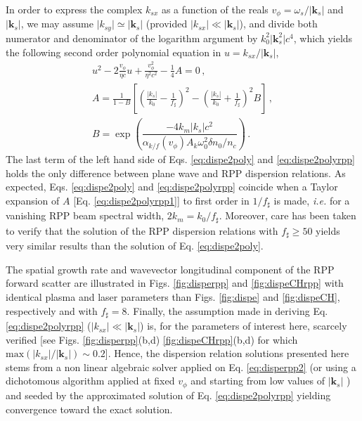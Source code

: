 \documentclass[
 reprint,
 amsmath,amssymb,
 aps,
]{revtex4-1}
\begin{document}
In order to express the complex $k_{sx}$ as a function of the reals $v_\phi=\omega_s/\vert \mathbf{k}_s\vert $ and $\vert \mathbf{k}_s\vert $, we may assume  $\vert k_{sy} \vert  \simeq \vert \mathbf{k}_s\vert$ (provided  $\vert k_{sx}\vert \ll \vert \mathbf{k}_s\vert$), and divide both numerator and denominator of the logarithm argument by $k_0^2\vert \mathbf{k}_s^2\vert c^4$, which yields the following second order polynomial equation in $u =  k_{sx}/\vert \mathbf{k}_s\vert$,
\begin{align}
u^2 -2\frac{v_\phi}{\eta c}u +\frac{v_\phi^2}{\eta^2 c^2}-\frac{1}{4}A =0 
\, , \label{eq:dispe2polyrpp} \\
A= \frac{1}{1-B}\left[ \left(\frac{\vert k_{s}\vert}{k_0}-\frac{1}{f_\sharp}\right)^2-\left(\frac{\vert k_{s}\vert}{k_0}+\frac{1}{f_\sharp}\right)^2B  \right]\, , \label{eq:dispe2polyrpp1}  \\ 
B =\exp\left(\dfrac{-4k_m \vert k_{s}\vert c^2}{\alpha_{k/f}(v_\phi)A_k \omega_0^2\delta n_0/n_c  }\right)\, .
\label{eq:dispe2polyrpp2} 
\end{align}
The last term of the left hand side of  Eqs. \eqref{eq:dispe2poly} and \eqref{eq:dispe2polyrpp} holds the only difference between plane wave and RPP dispersion relations. 
As expected,  Eqs.   \eqref{eq:dispe2poly} and     \eqref{eq:dispe2polyrpp} coincide when  a Taylor expansion of $A$ [Eq. \eqref{eq:dispe2polyrpp1}] to first order  in $1/f_\sharp$ is made, \emph{i.e.} for a vanishing  RPP beam spectral width, $2k_m=k_0/f_\sharp$.
Moreover, care has been taken to verify that the solution of the RPP dispersion relations with  $f_\sharp \ge 50$ yields  very similar results than the solution of Eq. \eqref{eq:dispe2poly}.

The spatial growth rate and wavevector  longitudinal component of the RPP forward scatter are illustrated in  
Figs. \ref{fig:disperpp} and \ref{fig:dispeCHrpp} with identical plasma and laser parameters than Figs.  \ref{fig:dispe} and \ref{fig:dispeCH}, respectively and  with $f_\sharp=8$. 
%
Finally, the assumption made in deriving Eq. \eqref{eq:dispe2polyrpp} ($\vert k_{sx}\vert \ll \vert \mathbf{k}_s\vert$) is, for the parameters of interest here, scarcely  verified [see Figs. \ref{fig:disperpp}(b,d)  \ref{fig:dispeCHrpp}(b,d) for which  $\mathrm{max}(\vert k_{sx}\vert/ \vert \mathbf{k}_s\vert)\sim 0.2$]. Hence, the dispersion relation solutions presented here stems from a non linear algebraic solver applied on Eq. \eqref{eq:disperpp2} (or using a dichotomous algorithm applied at fixed  $v_\phi$ and starting from low values of $\vert \mathbf{k}_s\vert$ ) and  seeded by the approximated solution of Eq. \eqref{eq:dispe2polyrpp} yielding convergence toward the exact solution. 
\end{document}
